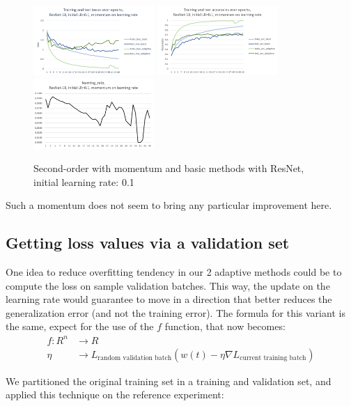 \documentclass{article}
\begin{document}
  \begin{figure}[!h]
  	\includegraphics[width=130pt]{loss_resnet_mom_lr_0_1.png}
  	\includegraphics[width=130pt]{acc_resnet_mom_lr_0_1.png}
  	\includegraphics[width=130pt]{lr_resnet_mom_lr_0_1.png}
  	\caption{Second-order with momentum and basic methods with ResNet, initial learning rate: 0.1}
  \end{figure}

  Such a momentum does not seem to bring any particular improvement here. 
  
  \subsection{Getting loss values via a validation set}
  
  One idea to reduce overfitting tendency in our 2 adaptive methods could be to compute the loss on sample validation batches. This way, the update on the learning rate would guarantee to move in a direction that better reduces the generalization error (and not the training error). The formula for this variant is the same, expect for the use of the $f$ function, that now becomes:\\
  \begin{align}
  f : R^{n} &\rightarrow R\\
  \eta &\rightarrow L_{\text{random validation batch}}(w(t)-\eta \nabla L_{\text{current training batch}})
  \end{align}
  
  We partitioned the original training set in a training and validation set, and applied this technique on the reference experiment:\\
  
\end{document}
